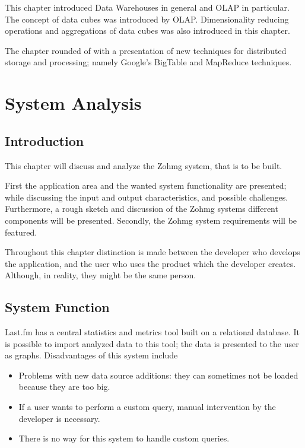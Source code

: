 This chapter introduced Data Warehouses in general and OLAP in particular. The
concept of data cubes was introduced by OLAP. Dimensionality reducing operations
and aggregations of data cubes was also introduced in this chapter.

The chapter rounded of with a presentation of new techniques for distributed
storage and processing; namely Google's BigTable and MapReduce techniques.



\chapter{System Analysis}



\section*{Introduction}

This chapter will discuss and analyze the Zohmg system, that is to be built.

First the application area and the wanted system functionality are presented;
while discussing the input and output characteristics, and possible challenges.
Furthermore, a rough sketch and discussion of the Zohmg systems different
components will be presented. Secondly, the Zohmg system requirements will be
featured.

Throughout this chapter distinction is made between the developer who develops
the application, and the user who uses the product which the developer
creates. Although, in reality, they might be the same person.


\section{System Function}

Last.fm has a central statistics and metrics tool built on a relational
database. It is possible to import analyzed data to this tool; the data is
presented to the user as graphs. Disadvantages of this system include
\begin{itemize}
\item Problems with new data source additions: they can sometimes not be loaded
because they are too big.
\item If a user wants to perform a custom query, manual intervention by the
developer is necessary.
\item There is no way for this system to handle custom queries.
\end{itemize}

